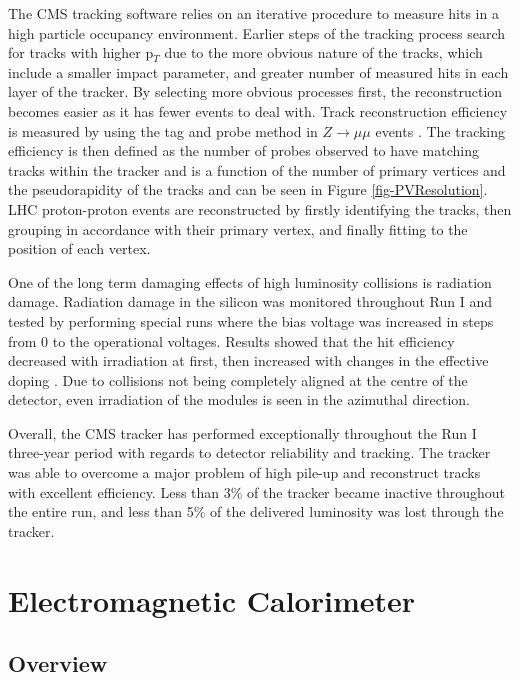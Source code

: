 The CMS tracking software relies on an iterative procedure to measure hits in a high particle occupancy environment. Earlier steps of the tracking process search for tracks with higher p$_T$ due to the more obvious nature of the tracks, which include a smaller impact parameter, and greater number of measured hits in each layer of the tracker. By selecting more obvious processes first, the reconstruction becomes easier as it has fewer events to deal with. Track reconstruction efficiency is measured by using the tag and probe method in $Z \to \mu\mu$ events \cite{TrackingResults}. The tracking efficiency is then defined as the number of probes observed to have matching tracks within the tracker and is a function of the number of primary vertices and the pseudorapidity of the tracks and can be seen in Figure \ref{fig-PVResolution}. LHC proton-proton events are reconstructed by firstly identifying the tracks, then grouping in accordance with their primary vertex, and finally fitting to the position of each vertex.  

One of the long term damaging effects of high luminosity collisions is radiation damage. Radiation damage in the silicon was monitored throughout Run I and tested by performing special runs where the bias voltage was increased in steps from 0 to the operational voltages. Results showed that the hit efficiency decreased with irradiation at first, then increased with changes in the effective doping \cite{Doping}. Due to collisions not being completely aligned at the centre of the detector, even irradiation of the modules is seen in the azimuthal direction.

Overall, the CMS tracker has performed exceptionally throughout the Run I three-year period with regards to detector reliability and tracking. The tracker was able to overcome a major problem of high pile-up and reconstruct tracks with excellent efficiency. Less than 3\% of the tracker became inactive throughout the entire run, and less than 5\% of the delivered luminosity was lost through the tracker.    
 
\section{Electromagnetic Calorimeter} \label{sec-ElectromagneticCalorimeter}

\subsection{Overview} \label{subsec-ECALOverview}

